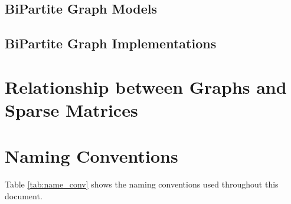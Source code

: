 

\subsection{BiPartite Graph Models}


\subsection{BiPartite Graph Implementations}


\section{Relationship between Graphs and Sparse Matrices}



\section{Naming Conventions}


Table \ref{tab:name_conv} shows the naming conventions used throughout this document. 

